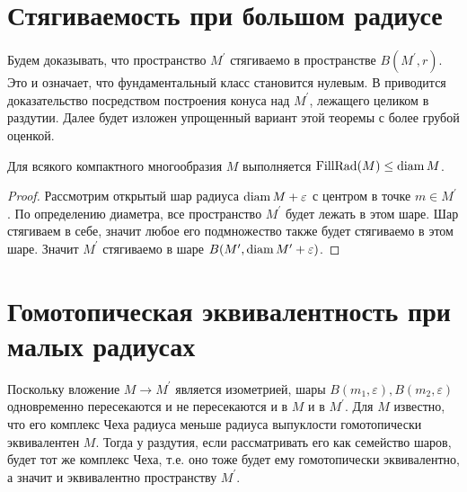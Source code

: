 \documentclass[11pt,twoside
]{article}
\begin{document}
\section{Стягиваемость при большом радиусе}
Будем доказывать, что пространство \( M ^\prime \) стягиваемо в
пространстве \( B(M
^{\prime},r) \). Это и означает, что фундаментальный класс становится
нулевым. В \cite{katz1983filling} приводится доказательство
посредством построения конуса над \( M^\prime \), лежащего целиком в
раздутии. Далее будет изложен упрощенный вариант этой теоремы с более
грубой оценкой.
\begin{theorem}
  Для всякого компактного многообразия \( M \) выполняется \(
  \operatorname{FillRad}(M) \leq \operatorname{diam} M \).
\end{theorem}
\begin{proof}
  Рассмотрим открытый шар радиуса \( \operatorname{diam} M + \varepsilon \) с центром в
  точке \( m \in M^\prime\). По определению диаметра, все
  пространство \( M^\prime \) будет лежать в этом шаре. Шар стягиваем
  в себе, значит любое его подмножество также будет стягиваемо в этом
  шаре. Значит \( M^\prime \) стягиваемо в шаре \( B(M',\operatorname{diam}
  M^\prime + \varepsilon ) \).
\end{proof}
\section{Гомотопическая эквивалентность при малых радиусах}
Поскольку вложение \( M \rightarrow M^\prime \) является изометрией,
шары \( B(m_1,\varepsilon), B(m_2, \varepsilon )\) одновременно
пересекаются и не пересекаются и в \( M \) и в \( M^\prime \). Для \(
M \) известно, что его комплекс Чеха радиуса меньше радиуса
выпуклости гомотопически эквивалентен \( M \).
Тогда у раздутия, если рассматривать его как семейство шаров, будет
тот же комплекс Чеха, т.е. оно тоже будет ему гомотопически
эквивалентно, а значит и эквивалентно пространству \( M^\prime\).
\printbibliography
\end{document}
